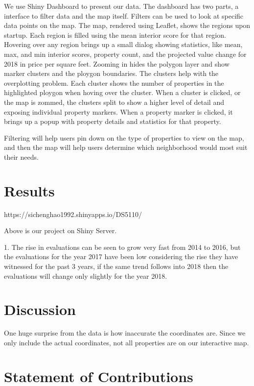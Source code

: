 \documentclass[12pt]{article}
\begin{document}
We use Shiny Dashboard \cite{ShinyDas50:online} to present our data. The 
dashboard has two parts, a interface to filter data and the map itself. 
Filters can be used to look at specific data points on the map. The map,
rendered using Leaflet, shows the regions upon startup. Each region is
filled using the mean interior score for that region. Hovering over any
region brings up a small dialog showing statistics, like mean, max, and
min interior scores, property count, and the projected value change for
2018 in price per square feet. Zooming in hides the polygon layer and
show marker clusters and the ploygon boundaries. The clusters help with
the overplotting problem. Each cluster shows the number of properties in
the highlighted ploygon when hoving over the cluster. When a cluster is
clicked, or the map is zommed, the clusters split to show a higher level
of detail and exposing individual property markers. When a property
marker is clicked, it brings up a popup with property details and
statistics for that property.

Filtering will help users pin down on the type of properties to view on
the map, and then the map will help users determine which neighborhood
would most suit their needs.

\section*{Results}

https://sichenghao1992.shinyapps.io/DS5110/

Above is our project on Shiny Server. 


1. The rise in evaluations can be seen to grow very fast from 2014 to 2016, but the 
evaluations for the year 2017 have been low considering the rise they have witnessed 
for the past 3 years, if the same trend follows into 2018 then the evaluations will change 
only slightly for the year 2018.

\section*{Discussion}

One huge surprise from the data is how inaccurate the coordinates are. Since we only include the actual coordinates, not all properties are on our interactive map. 

\section*{Statement of Contributions}
\end{document}
